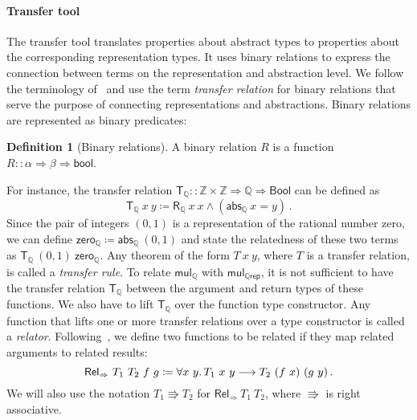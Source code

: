 \documentclass{article}
\theoremstyle{definition}
\newtheorem{definition}{Definition}[section]
\newcommand{\bool}{\mathsf{Bool}}
\newcommand{\relfun}{\mathsf{Rel_\Rightarrow}}
\newcommand{\rel}{\mathsf{Rel}}
\newcommand{\inte}{\mathbb{Z}}
\newcommand{\rat}{\mathbb{Q}}
\newcommand{\abs}{\mathsf{abs}}
\begin{document}
\paragraph{Transfer tool} The transfer tool translates properties about abstract types to properties about the corresponding representation types.
It uses binary relations to express the connection between terms on the representation and abstraction level.
We follow the terminology of~\cite{huffman2013lifting}
and use the term \textit{transfer relation} for binary relations that serve the purpose of connecting representations and abstractions.
Binary relations are represented as binary predicates:
\begin{definition}[Binary relations]
	A binary relation $R$ is a function \(R :: \alpha \Rightarrow \beta \Rightarrow \mathsf{bool}\).
\end{definition}
For instance, the transfer relation \(\mathsf{T_\rat} :: \inte \times \inte \Rightarrow \rat \Rightarrow \bool\) can be defined as
\begin{equation}\label{eq:trans-rel-rat}
	\mathsf{T_\rat}\ x\ y \coloneqq \mathsf{R_\rat}\ x\ x \land (\abs_\rat\ x = y)\,.
\end{equation}
Since the pair of integers \((0, 1)\) is a representation of the rational number zero,
we can define \(\mathsf{zero_\rat}\coloneqq\abs_\rat\ (0, 1)\) and state the relatedness of these two terms as \(\mathsf{T_\rat}\ (0, 1)\ \mathsf{zero_\rat}\).
Any theorem of the form \(T\ x\ y\),
where \(T\) is a transfer relation,
is called a \emph{transfer rule}.
To relate \(\mathsf{mul_\rat}\) with \(\mathsf{mul_{\rat rep}}\),
it is not sufficient to have the transfer relation $\mathsf{T}_\rat$ between the argument and return types of these functions.
We also have to lift \(\mathsf{T}_\rat\) over the function type constructor.
Any function that lifts one or more transfer relations over a type constructor is called
a \emph{relator}.
Following~\cite{wadler1989theorems},
we define two functions
to be related if they map related arguments to related results:
\begin{equation*}
	\rel_\Rightarrow\ T_1\ T_2\ f\ g \coloneqq \forall x\ y\ldotp T_1\ x\ y \longrightarrow T_2\ (f\ x)\ (g\ y)\,.
\end{equation*}
We will also use the notation \(T_1 \Rrightarrow T_2\) for \(\relfun\ T_1\ T_2\), where \(\Rrightarrow\) is right associative.
\end{document}
